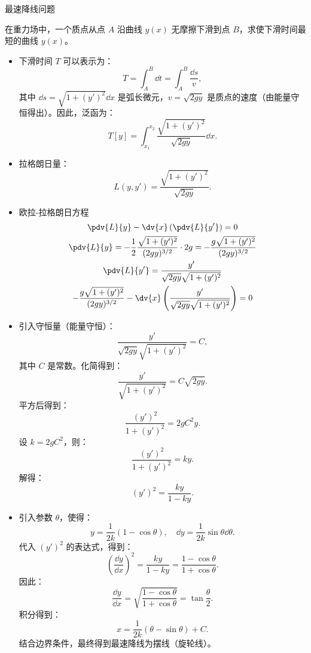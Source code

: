 \documentclass[12pt, a4paper, oneside, UTF8]{ctexbook}  %
\begin{document}
\begin{example}
最速降线问题

在重力场中，一个质点从点 \( A \) 沿曲线 \( y(x) \) 无摩擦下滑到点 \( B \)，求使下滑时间最短的曲线 \( y(x) \)。
\begin{itemize}
    \item 
下滑时间 \( T \) 可以表示为：
\[
T = \int_{A}^{B} \dd t = \int_{A}^{B} \frac{\dd s}{v},
\]
其中 \( \dd s = \sqrt{1 + (y')^2} \dd x \) 是弧长微元，\( v = \sqrt{2gy} \) 是质点的速度（由能量守恒得出）。因此，泛函为：
\[
T[y] = \int_{x_1}^{x_2} \frac{\sqrt{1 + (y')^2}}{\sqrt{2gy}} \dd x.
\]
\item 拉格朗日量：
\[
L(y, y') = \frac{\sqrt{1 + (y')^2}}{\sqrt{2gy}}.
\]
\item  欧拉-拉格朗日方程
\begin{gather*}
    \pdv{L}{y} - \dv{x} \left( \pdv{L}{y'} \right) = 0
\\
\pdv{L}{y} = -\frac{1}{2} \frac{\sqrt{1 + (y')^2}}{(2gy)^{3/2}} \cdot 2g 
= -\frac{g \sqrt{1 + (y')^2}}{(2gy)^{3/2}}
\\
\pdv{L}{y'} = \frac{y'}{\sqrt{2gy} \sqrt{1 + (y')^2}}
\\
-\frac{g \sqrt{1 + (y')^2}}{(2gy)^{3/2}} - \dv{x} 
\left( \frac{y'}{\sqrt{2gy} \sqrt{1 + (y')^2}} \right) = 0
\end{gather*}
\item  
引入守恒量（能量守恒）：
\[
\frac{y'}{\sqrt{2gy} \sqrt{1 + (y')^2}} = C,
\]
其中 \( C \) 是常数。化简得到：
\[
\frac{y'}{\sqrt{1 + (y')^2}} = C \sqrt{2gy}.
\]
平方后得到：
\[
\frac{(y')^2}{1 + (y')^2} = 2g C^2 y.
\]
设 \( k = 2g C^2 \)，则：
\[
\frac{(y')^2}{1 + (y')^2} = k y.
\]
解得：
\[
(y')^2 = \frac{k y}{1 - k y}.
\]
\item  
引入参数 \( \theta \)，使得：
\[
y = \frac{1}{2k} (1 - \cos \theta), \quad \dd y = \frac{1}{2k} \sin \theta \dd \theta.
\]
代入 \( (y')^2 \) 的表达式，得到：
\[
\left( \frac{\dd y}{\dd x} \right)^2 = \frac{k y}{1 - k y} = \frac{1 - \cos \theta}{1 + \cos \theta}.
\]
因此：
\[
\frac{\dd y}{\dd x} = \sqrt{\frac{1 - \cos \theta}{1 + \cos \theta}} = \tan \frac{\theta}{2}.
\]
积分得到：
\[
x = \frac{1}{2k} (\theta - \sin \theta) + C.
\]
结合边界条件，最终得到最速降线为摆线（旋轮线）。
\end{itemize}
\end{example}
\end{document}
